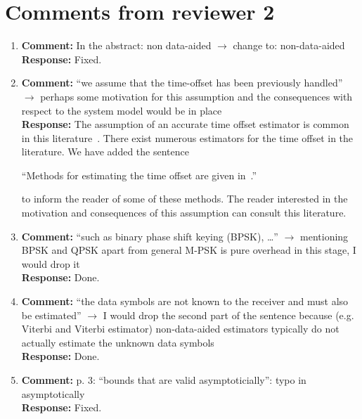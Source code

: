 \documentclass{article}
\begin{document}
\section{Comments from reviewer 2}

\begin{enumerate}

\item \textbf{Comment:} In the abstract: non data-aided $\to$ change to: non-data-aided \\
\textbf{Response:} Fixed.

\item \textbf{Comment:} ``we assume that the time-offset has been previously handled'' $\to$ perhaps some motivation for this assumption and the consequences with respect to the system model would be in place \\
\textbf{Response:}  The assumption of an accurate time offset estimator is common in this literature~\cite{ViterbiViterbi_phase_est_1983,Cowley_ref_sym_carr_1998,Wilson1989,Makrakis1990,Liu1991,Mackenthun1994,Sweldens2001,McKilliamLinearTimeBlockPSK2009,Divsalar1990}.%
There exist numerous estimators for the time offset in the literature.  We have added the sentence 

``Methods for estimating the time offset are given in~\cite{Massey1972optimumframe,Oerder_synch_square_circstat_2008,McKilliam_time_offset_pilots_data_2013}.'' 

to inform the reader of some of these methods.  The reader interested in the motivation and consequences of this assumption can consult this literature.


\item \textbf{Comment:} ``such as binary phase shift keying (BPSK), \dots'' $\to$ mentioning BPSK and QPSK apart from general M-PSK is pure overhead in this stage, I would drop it \\
\textbf{Response:} Done.

\item \textbf{Comment:} ``the data symbols are not known to the receiver and must also be estimated'' $\to$ I would drop the second part of the sentence because (e.g. Viterbi and Viterbi estimator) non-data-aided estimators typically do not actually estimate the unknown data symbols \\
\textbf{Response:} Done.

\item \textbf{Comment:} p. 3: ``bounds that are valid asymptoticially'': typo in asymptotically \\
\textbf{Response:} Fixed.


\end{enumerate}
\end{document}
